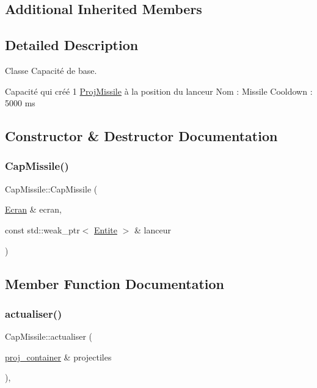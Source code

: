 \subsection*{Additional Inherited Members}


\subsection{Detailed Description}
Classe Capacité de base. 

Capacité qui créé 1 \mbox{\hyperlink{class_proj_missile}{Proj\+Missile}} à la position du lanceur Nom \+: Missile Cooldown \+: 5000 ms 

\subsection{Constructor \& Destructor Documentation}
\mbox{\label{class_cap_missile_a6cb9e154556aab9d8a7f41bd7d7cfdbc}} 
\subsubsection{\texorpdfstring{Cap\+Missile()}{CapMissile()}}
{\footnotesize\ttfamily Cap\+Missile\+::\+Cap\+Missile (\begin{DoxyParamCaption}\item[{\mbox{\hyperlink{class_ecran}{Ecran}} \&}]{ecran,  }\item[{const std\+::weak\+\_\+ptr$<$ \mbox{\hyperlink{class_entite}{Entite}} $>$ \&}]{lanceur }\end{DoxyParamCaption})}



\subsection{Member Function Documentation}
\mbox{\label{class_cap_missile_ae61423876aa92fc8e2555b1b856a7443}} 
\subsubsection{\texorpdfstring{actualiser()}{actualiser()}}
{\footnotesize\ttfamily Cap\+Missile\+::actualiser (\begin{DoxyParamCaption}\item[{\mbox{\hyperlink{def__type_8h_a87980cd8ee9533e561a73e8bbc728188}{proj\+\_\+container}} \&}]{projectiles }\end{DoxyParamCaption})\hspace{0.3cm}{\ttfamily [override]}, {\ttfamily [virtual]}}



